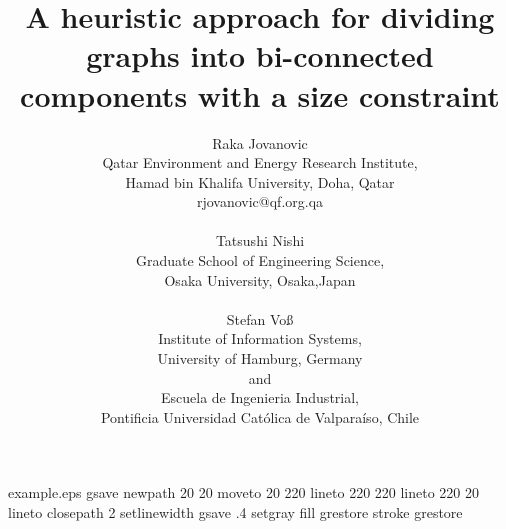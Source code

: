 \begin{filecontents*}{example.eps}
gsave
newpath
  20 20 moveto
  20 220 lineto
  220 220 lineto
  220 20 lineto
closepath
2 setlinewidth
gsave
  .4 setgray fill
grestore
stroke
grestore
\end{filecontents*}
\RequirePackage{fix-cm}
\documentclass{article}       

\usepackage{graphicx}
\usepackage{amssymb}
\usepackage{supertabular}
\usepackage{amsmath}
\usepackage{algpseudocode}
\usepackage{algorithm}
\usepackage{tabularx}
\usepackage{multicol}
\usepackage{lineno}
\usepackage{booktabs}
\usepackage{lscape}
\usepackage{natbib}
\usepackage{subfigure}
\usepackage{color}



\title{A heuristic approach for dividing graphs into bi-connected components with a size constraint}




\author{Raka Jovanovic      \\
Qatar Environment and Energy Research Institute,\\
 Hamad bin Khalifa University, Doha, Qatar\\
 rjovanovic@qf.org.qa\\
 \\
        Tatsushi Nishi \\
          Graduate School of Engineering Science,\\
           Osaka University,  Osaka,Japan\\
            \\
        Stefan Vo{\ss}\\
        Institute of Information Systems, \\
        University of Hamburg, Germany\\
        and\\
 Escuela de Ingenieria Industrial, \\
Pontificia Universidad Cat\'olica de Valpara\'iso, Chile
        }








\maketitle

